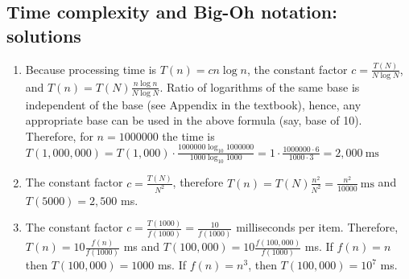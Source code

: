 \documentclass[]{article}
\begin{document}
\subsection{Time complexity and Big-Oh notation: solutions}
\begin{enumerate}

\item Because processing time is \(T(n) = c n\log n\),
the constant factor \(c = \frac{T(N)}{N\log N}\), and
\(
T(n) = T(N)\frac{n \log n}{N \log N}
\).
Ratio of logarithms of the same base
is independent of the base (see Appendix in the textbook),
hence, any appropriate base can be used in the above
formula (say, base of 10). 
Therefore, for \(n = 1000000\) the time is   
\(
T(1,000,000) = T(1,000) \cdot 
\frac{1000000\log_{10} 1000000}{1000\log_{10} 1000}
= 1 \cdot \frac{1000000 \cdot 6}{1000 \cdot 3} = 
2,000 \ \mathrm{ms}
\)  

\item The constant factor \(c = \frac{T(N)}{N^2 }\), therefore
\(
T(n) = T(N)\frac{n^2}{N^2} = \frac{n^2}{10000}\ \mathrm{ms}
\)
and \(T(5000) = 2,500\) ms.

\item The constant factor 
\(c = \frac{T(1000)}{f(1000)} = \frac{10}{f(1000)}\) milliseconds per item. 
Therefore,
\(T(n)=10\frac{f(n)}{f(1000)}\) ms and
\(T(100,000)=10\frac{f(100,000)}{f(1000)}\) ms.
If \(f(n)=n\) then \(T(100,000) = 1000\) ms. If 
\(f(n)=n^3\), then \(T(100,000) = 10^7\) ms.


\end{enumerate}
\end{document}
